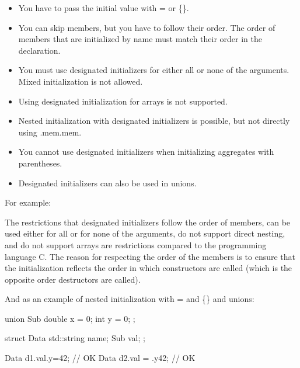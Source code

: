 \begin{itemize}
\item 
You have to pass the initial value with = or \{\}.

\item 
You can skip members, but you have to follow their order. The order of members that are initialized by name must match their order in the declaration.

\item 
You must use designated initializers for either all or none of the arguments. Mixed initialization is not allowed.

\item 
Using designated initialization for arrays is not supported.

\item 
Nested initialization with designated initializers is possible, but not directly using .mem.mem.

\item 
You cannot use designated initializers when initializing aggregates with parentheses.

\item 
Designated initializers can also be used in unions.
\end{itemize}

For example:


The restrictions that designated initializers follow the order of members, can be used either for all or for none of the arguments, do not support direct nesting, and do not support arrays are restrictions compared to the programming language C. The reason for respecting the order of the members is to ensure that the initialization reflects the order in which constructors are called (which is the opposite order destructors are called).

And as an example of nested initialization with = and \{\} and unions:

\begin{cpp}
union Sub {
	double x = 0;
	int y = 0;
};

struct Data {
	std::string name;
	Sub val;
};

Data d1{.val{.y=42}}; // OK
Data d2{.val = {.y{42}}}; // OK
\end{cpp}

